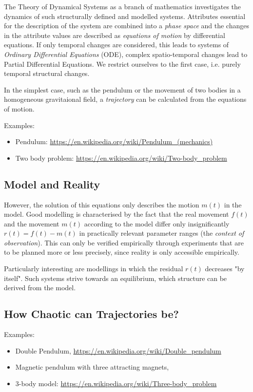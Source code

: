 \documentclass[11pt,a4paper]{article}
\begin{document}
The Theory of Dynamical Systems as a branch of mathematics investigates the
dynamics of such structurally defined and modelled systems. Attributes
essential for the description of the system are combined into a \emph{phase
  space} and the changes in the attribute values are described as
\emph{equations of motion} by differential equations. If only temporal changes
are considered, this leads to systems of \emph{Ordinary Differential
  Equations} (ODE), complex spatio-temporal changes lead to Partial
Differential Equations. We restrict ourselves to the first case, i.e. purely
temporal structural changes.

In the simplest case, such as the pendulum or the movement of two bodies in a
homogeneous gravitaional field, a \emph{trajectory} can be calculated from the
equations of motion.

Examples:
\begin{itemize}
\item Pendulum: \url{https://en.wikipedia.org/wiki/Pendulum_(mechanics)}
\item Two body problem: \url{https://en.wikipedia.org/wiki/Two-body_problem}
\end{itemize}

\subsection{Model and Reality}

However, the solution of this equations only describes the motion $m(t)$ in
the model. Good modelling is characterised by the fact that the real movement
$f(t)$ and the movement $m(t)$ according to the model differ only
insignificantly $r(t)=f(t)-m(t)$ in practically relevant parameter ranges (the
\emph{context of observation}). This can only be verified empirically through
experiments that are to be planned more or less precisely, since reality is
only accessible empirically.

Particularly interesting are modellings in which the residual $r(t)$ decreases
"by itself". Such systems strive towards an equilibrium, which structure can
be derived from the model.

\subsection{How Chaotic can Trajectories be?} 

Examples: 
\begin{itemize}
\item Double Pendulum, \url{https://en.wikipedia.org/wiki/Double_pendulum}
\item Magnetic pendulum with three attracting magnets,
\item 3-body model: \url{https://en.wikipedia.org/wiki/Three-body_problem}
\end{itemize}
\end{document}
